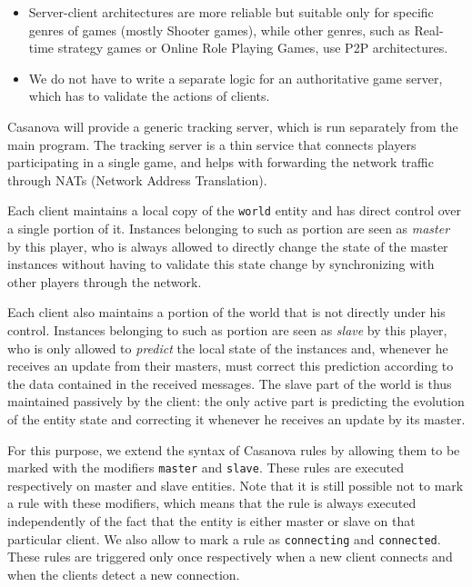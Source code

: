 \begin{itemize}
	\item Server-client architectures are more reliable but suitable only for specific genres of games (mostly Shooter games), while other genres, such as Real-time strategy games or Online Role Playing Games, use P2P architectures.
	\item We do not have to write a separate logic for an authoritative game server, which has to validate the actions of clients.
\end{itemize}

Casanova will provide a generic tracking server, which is run separately from the main program. The tracking server is a thin service that connects players participating in a single game, and helps with forwarding the network traffic through NATs (Network Address Translation).

Each client maintains a local copy of the \texttt{world} entity and has direct control over a single portion of it. Instances belonging to such as portion are seen as \textit{master} by this player, who is always allowed to directly change the state of the master instances without having to validate this state change by synchronizing with other players through the network.

Each client also maintains a portion of the world that is not directly under his control. Instances belonging to such as portion are seen as \textit{slave} by this player, who is only allowed to \textit{predict} the local state of the instances and, whenever he receives an update from their masters, must correct this prediction according to the data contained in the received messages. The slave part of the world is thus maintained passively by the client: the only active part is predicting the evolution of the entity state and correcting it whenever he receives an update by its master.

For this purpose, we extend the syntax of Casanova rules by allowing them to be marked with the modifiers \texttt{master} and \texttt{slave}. These rules are executed respectively on master and slave entities. Note that it is still possible not to mark a rule with these modifiers, which means that the rule is always executed independently of the fact that the entity is either master or slave on that particular client. We also allow to mark a rule as \texttt{connecting} and \texttt{connected}. These rules are triggered only once respectively when a new client connects and when the clients detect a new connection.

